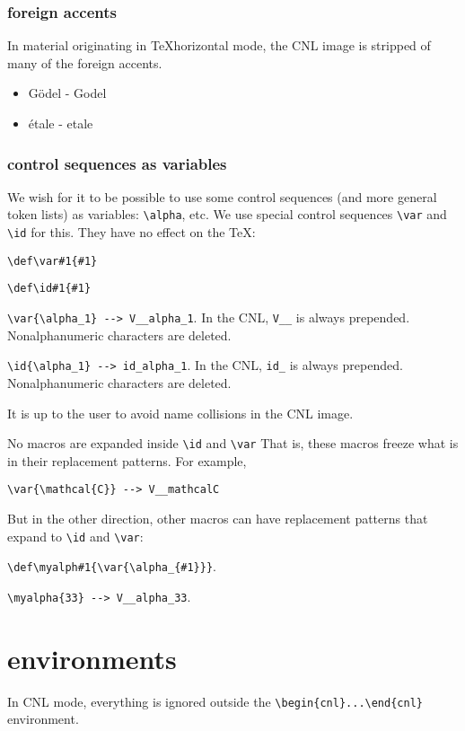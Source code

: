 \documentclass[12pt]{amsart}
\begin{document}
\subsubsection{foreign accents}

In material originating in \TeX horizontal mode, 
the CNL image is
stripped of many of the foreign accents.

\begin{itemize}
\item G\"odel - Godel
\item \'etale - etale
\end{itemize}

\subsubsection{control sequences as variables}

We wish for it to be possible to use some control sequences (and more general token lists)
as variables: \verb!\alpha!, etc.
We use special control sequences \verb!\var! and \verb!\id! for this.
They have no effect on the \TeX:

\verb!\def\var#1{#1}!

\verb!\def\id#1{#1}!

\verb!\var{\alpha_1} --> V__alpha_1!. In the CNL, \verb!V__! is always prepended.  Nonalphanumeric
characters are deleted.

\verb!\id{\alpha_1} --> id_alpha_1!.  In the CNL, \verb!id_! is always prepended. Nonalphanumeric
characters are deleted.

It is up to the user to avoid name collisions in the CNL image.

No macros are expanded inside \verb!\id! and \verb!\var!  That is, these macros freeze what is in their
replacement patterns.   
For example,

\verb!\var{\mathcal{C}} --> V__mathcalC!

But in the other direction, other macros can have replacement patterns that
expand to \verb!\id! and \verb!\var!:

\verb!\def\myalph#1{\var{\alpha_{#1}}}!.

\verb!\myalpha{33} --> V__alpha_33!.


\section{environments}

In CNL mode, everything is ignored outside the
\verb!\begin{cnl}...\end{cnl}! environment.
\end{document}
